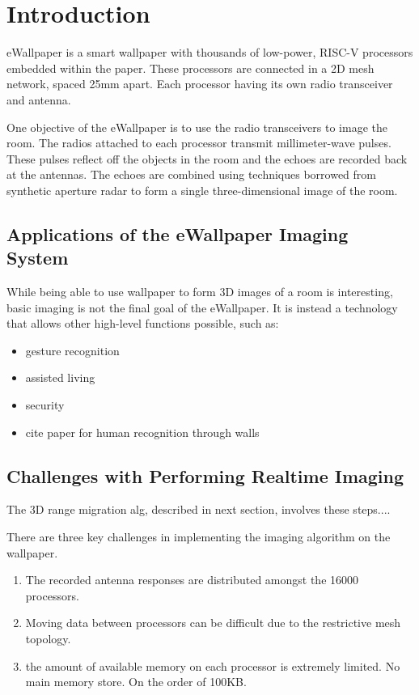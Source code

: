 \section{Introduction}

eWallpaper is a smart wallpaper with thousands of low-power, RISC-V \cite{riscv} processors embedded within the paper. These processors are connected in a 2D mesh network, spaced 25mm apart. Each processor having its own radio transceiver and antenna.

One objective of the eWallpaper is to use the radio transceivers to image the room. The radios attached to each processor transmit millimeter-wave pulses. These pulses reflect off the objects in the room and the echoes are recorded back at the antennas. The echoes are combined using techniques borrowed from synthetic aperture radar to form a single three-dimensional image of the room.

\subsection{Applications of the eWallpaper Imaging System}

While being able to use wallpaper to form 3D images of a room is interesting, basic imaging is not the final goal of the eWallpaper. It is instead a technology that allows other high-level functions possible, such as:

\begin{itemize}
\item gesture recognition
\item assisted living
\item security 
\item cite paper for human recognition through walls
\end{itemize}

\subsection{Challenges with Performing Realtime Imaging}

The 3D range migration alg, described in next section, involves these steps....

There are three key challenges in implementing the imaging algorithm on the wallpaper.
\begin{enumerate}
\item The recorded antenna responses are distributed amongst the 16000 processors.
\item Moving data between processors can be difficult due to the restrictive mesh topology.
\item the amount of available memory on each processor is extremely limited. No main memory store. On the order of 100KB.
\end{enumerate}

